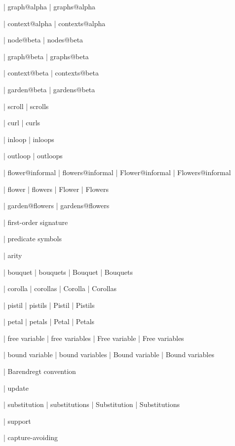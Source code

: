  | graph@alpha
 | graphs@alpha

 | context@alpha
 | contexts@alpha

 | node@beta
 | nodes@beta

 | graph@beta
 | graphs@beta

 | context@beta
 | contexts@beta

 | garden@beta
 | gardens@beta


 | scroll
 | scrolls

 | curl
 | curls

 | inloop
 | inloops

 | outloop
 | outloops

 | flower@informal
 | flowers@informal
 | Flower@informal
 | Flowers@informal

 | flower
 | flowers
 | Flower
 | Flowers

 | garden@flowers
 | gardens@flowers

 | first-order signature

 | predicate symbols

 | arity

 | bouquet
 | bouquets
 | Bouquet
 | Bouquets

 | corolla
 | corollas
 | Corolla
 | Corollas

 | pistil
 | pistils
 | Pistil
 | Pistils

 | petal
 | petals
 | Petal
 | Petals

 | free variable
 | free variables
 | Free variable
 | Free variables

 | bound variable
 | bound variables
 | Bound variable
 | Bound variables

 | Barendregt convention

 | update

 | substitution
 | substitutions
 | Substitution
 | Substitutions

 | support

 | capture-avoiding

